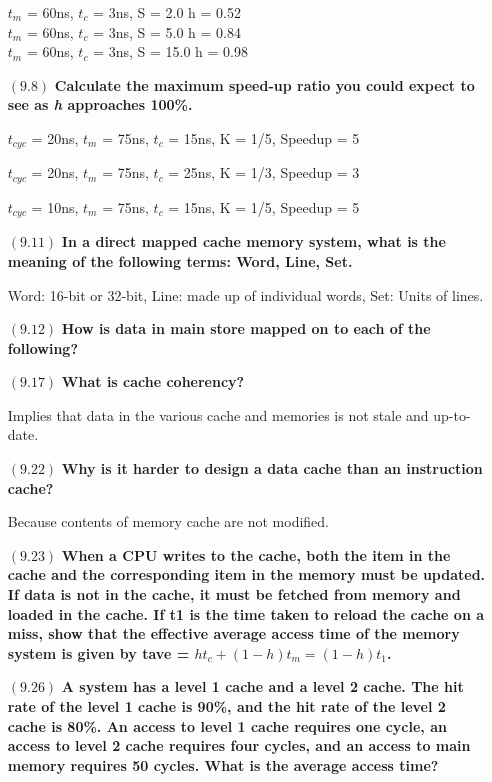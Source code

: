 \documentclass[letterpaper,10pt,titlepage]{article}
\begin{document}
\begin{enumerate}
$t_m$ = 60ns, $t_c$ = 3ns, S = 2.0
h = 0.52\\

$t_m$ = 60ns, $t_c$ = 3ns, S = 5.0
h = 0.84\\

$t_m$ = 60ns, $t_c$ = 3ns, S = 15.0
h = 0.98

\item[$(9.8)$] \textbf{Calculate the maximum speed-up ratio you could expect to see as \textit{h} approaches 100\%.}

$t_{cyc}$ = 20ns, $t_m$ = 75ns, $t_c$ = 15ns, K = 1/5, Speedup = 5

$t_{cyc}$ = 20ns, $t_m$ = 75ns, $t_c$ = 25ns, K = 1/3, Speedup = 3

$t_{cyc}$ = 10ns, $t_m$ = 75ns, $t_c$ = 15ns, K = 1/5, Speedup = 5

\item[$(9.11)$] \textbf{In a direct mapped cache memory system, what is the meaning of the following terms: Word, Line, Set.}

Word: 16-bit or 32-bit, Line: made up of individual words, Set: Units of lines.

\item[$(9.12)$] \textbf{How is data in main store mapped on to each of the following?}

\item[$(9.17)$] \textbf{What is cache coherency?}

Implies that data in the various cache and memories is not stale and up-to-date.
	
\item[$(9.22)$] \textbf{Why is it harder to design a data cache than an instruction cache?}

Because contents of memory cache are not modified.

\item[$(9.23)$] \textbf{When a CPU writes to the cache, both the item in the cache and the corresponding item in the memory must be updated. If data is not in the cache, it must be fetched from memory and loaded in the cache. If t1 is the time taken to reload the cache on a miss, show that the effective average access time of the memory system is given by tave = $ht_c + (1 - h)t_m = (1 - h)t_1$.}

\item[$(9.26)$] \textbf{A system has a level 1 cache and a level 2 cache. The hit rate of the level 1 cache is 90\%, and the hit rate of the level 2 cache is 80\%. An access to level 1 cache requires one cycle, an access to level 2 cache requires four cycles, and an access to main memory requires 50 cycles. What is the average access time?}


\end{enumerate}
\end{document}
